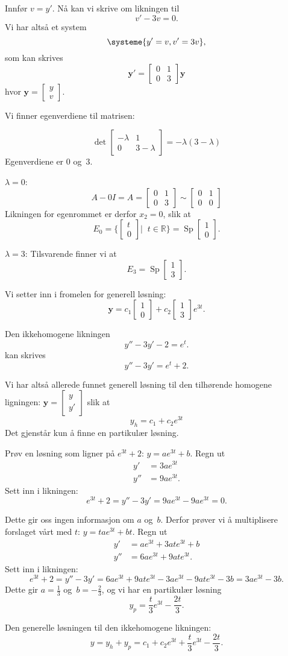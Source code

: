 \documentclass[notitlepage,a4paper,12pt,norsk]{IMFeksamen}
\DeclareMathOperator{\Sp}{Sp}
\newcommand{\V}[1]{\mathbf{#1}}
\newcommand{\vv}[2]{\begin{bmatrix} #1 \\ #2 \end{bmatrix}}
\newcommand{\0}{\V{0}}
\newcommand{\oppgslutt}{
\begin{center}
\pgfornament[width=6cm]{88}
\end{center}
}
\newenvironment{losning}{\begin{oppgave}}{\oppgslutt\end{oppgave}}
\begin{document}
\begin{losning}
Innfør $v=y'$. Nå kan vi skrive om likningen til 
\[
v'-3v=0.
\]
Vi har altså et system
\[
\systeme{
y'=v,
v'=3v
},
\]
som kan skrives 
\[
\V{y}'=\begin{bmatrix}
0 & 1\\
0 & 3
\end{bmatrix}\V{y}
\]
hvor $\V{y}=\vv{y}{v}$.

Vi finner egenverdiene til matrisen:

\[
\det \begin{bmatrix}
-\lambda & 1\\
0 & 3-\lambda
\end{bmatrix}=-\lambda(3-\lambda)
\]
Egenverdiene er $0$ og~$3$. 


$\lambda=0$: 
\[
A-0I=A=\begin{bmatrix}
0 & 1\\
0 & 3
\end{bmatrix}\sim
\begin{bmatrix}
0 & 1\\
0 & 0
\end{bmatrix}
\]
Likningen for egenrommet er derfor $x_2=0$, slik at \[
E_0=\{\vv{t}{0}|\;\; t\in \mathbb{R}\}=\Sp\vv{1}{0}.
\]

$\lambda=3$: Tilsvarende finner vi at 
\[
E_3=\Sp\vv{1}{3}.
\]

Vi setter inn i fromelen for generell løsning:
\[
\V{y} =c_1\vv{1}{0}+c_2\vv{1}{3}e^{3t}.
\]

Den ikkehomogene likningen 
\[
y''-3y'-2 = e^t.
\]
kan skrives
\[
y''-3y' = e^t+2.
\]

Vi har altså allerede funnet generell løsning til den tilhørende homogene ligningen: $\V{y}=\vv{y}{y'}$ slik at 
\[
y_h=c_1+c_2e^{3t}
\]
Det gjenstår kun å finne en partikulær løsning.

Prøv en løsning som ligner på $e^{3t}+2$: $y=ae^{3t}+b$. Regn ut 
\begin{align*}
y'&=3ae^{3t}\\
y''&=9ae^{3t}.
\end{align*}
Sett inn i likningen:
\[
e^{3t}+2=y''-3y'=9ae^{3t}-9ae^{3t}=0.
\]

Dette gir oss ingen informasjon om $a$ og~$b$. Derfor prøver vi å multiplisere forslaget vårt med $t$: $y=tae^{3t}+bt$. Regn ut
\begin{align*}
y'&=ae^{3t}+3ate^{3t}+b\\
y''&=6ae^{3t}+9ate^{3t}.
\end{align*}
Sett inn i likningen:
\[
e^{3t}+2=y''-3y'=6ae^{3t}+9ate^{3t}-3ae^{3t}-9ate^{3t}-3b=3ae^{3t}-3b.
\]
Dette gir $a=\frac{1}{3}$ og~$b=-\frac{2}{3}$, og vi har en partikulær løsning
\[
y_p=\frac{t}{3}e^{3t}-\frac{2t}{3}.
\]


Den generelle løsningen til den ikkehomogene likningen:
\[
y=y_h+y_p=c_1+c_2e^{3t}+\frac{t}{3}e^{3t}-\frac{2t}{3}.
\]

\end{losning}
\end{document}
